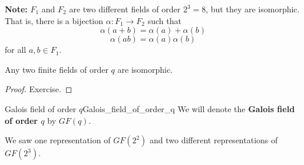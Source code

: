 \textbf{Note:} $ F_1 $ and $ F_2 $ are two different fields of order $ 2^3=8 $,
but they are isomorphic. That is,
there is a bijection $ \alpha : F_1\rightarrow F_2 $ such that
\[ \alpha(a+b)=\alpha(a)+\alpha(b) \]
\[ \alpha(ab)=\alpha(a)\alpha(b) \]
for all $ a,b\in F_1 $.

\begin{Theorem}{}{}
    Any two finite fields of order $ q $ are isomorphic.
\end{Theorem}

\begin{proof}
    Exercise.
\end{proof}

\begin{Definition}{Galois field of order $ q $}{Galois_field_of_order_q}
    We will denote the \textbf{Galois field of order $ q $} by $ GF(q) $.
\end{Definition}

We saw one representation of $ GF(2^2) $
and two different representations of $ GF(2^3) $.
